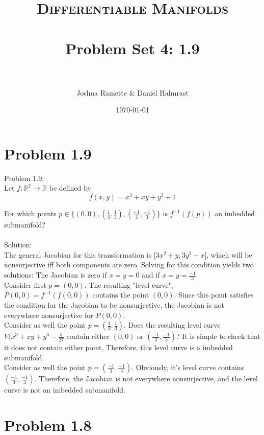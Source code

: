 \documentclass[paper=a4, fontsize=11pt]{article} %
\title{    
\normalfont \normalsize 
\textsc{Differentiable Manifolds} \\ [25pt] %
\horrule{0.5pt} \\[0.4cm] %
\huge Problem Set 4: 1.9 \\ %
\horrule{2pt} \\[0.5cm] %
}
\author{Joshua Ramette \& Daniel Halmrast} %
\date{\normalsize\today} %
\numberwithin{equation}{section} %
\numberwithin{figure}{section} %
\numberwithin{table}{section} %
\begin{document}
\maketitle %


\section*{Problem 1.9}

Problem 1.9:\\
Let $f:\mathbb{R^2} \to \mathbb{R}$ be defined by
\[
f(x,y) = x^3 + xy + y^3 + 1
\]

For which points $p \in \{(0,0),(\frac{1}{3},\frac{1}{3}),(\frac{-1}{3},\frac{-1}{3})\}$
is $f^{-1}({f(p)})$ an imbedded submanifold?\\
\\


Solution:\\
The general Jacobian for this transformation is $\big[3x^2 + y, 3y^2 + x\big]$, which will be nonsurjective
iff both components are zero.
Solving for this condition yields two solutions: The Jacobian is zero if $x=y=0$ and if $x=y=\frac{-1}{3}$\\

Consider first $p=(0,0)$. The resulting "level curve", $P(0,0)=f^{-1}({f(0,0)})$ contains the point $(0,0)$.
Since this point satisfies the condition for the Jacobian to be nonsurjective, the Jacobian is not everywhere nonsurjective 
for $P(0,0)$.\\

Consider as well the point $p=(\frac{1}{3},\frac{1}{3})$. 
Does the resulting level curve $V(x^3 + xy + y^3 - \frac{5}{27}$ contain either $(0,0)$ or $(\frac{-1}{3},\frac{-1}{3})$?
It is simple to check that it does not contain either point, Therefore, this level curve is a imbedded submanifold.\\

Consider as well the point $p=(\frac{-1}{3},\frac{-1}{3})$. 
Obviously, it's level curve contains $(\frac{-1}{3},\frac{-1}{3})$. Therefore, the Jacobian is not everywhere nonsurjective, and the level curve is not an imbedded submanifold.


\section*{Problem 1.8}
\end{document}
